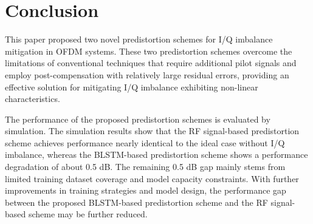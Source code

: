 \documentclass[lettersize,journal]{IEEEtran}
\begin{document}
\section{Conclusion}

This paper proposed two novel predistortion schemes for I/Q imbalance mitigation in OFDM systems.
These two predistortion schemes overcome the limitations of conventional techniques that require additional pilot signals and employ post-compensation with relatively large residual errors, providing an effective solution for mitigating I/Q imbalance exhibiting non-linear characteristics.

The performance of the proposed predistortion schemes is evaluated by simulation.
The simulation results show that the RF signal-based predistortion scheme achieves performance nearly identical to the ideal case without I/Q imbalance, whereas the BLSTM-based predistortion scheme shows a performance degradation of about 0.5 dB.
The remaining 0.5 dB gap mainly stems from limited training dataset coverage and model capacity constraints.
With further improvements in training strategies and model design, the performance gap between the proposed BLSTM-based predistortion scheme and the RF signal-based scheme may be further reduced.


\end{document}
